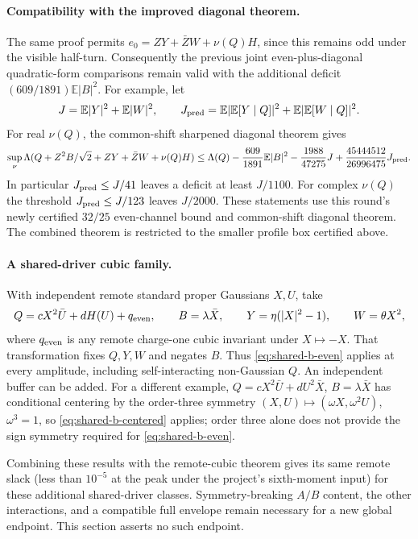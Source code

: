 \paragraph{Compatibility with the improved diagonal theorem.}
The same proof permits $e_0=ZY+\bar ZW+\nu(Q)H$, since this remains odd
under the visible half-turn. Consequently the previous joint
 even-plus-diagonal quadratic-form comparisons remain valid with the
additional deficit $(609/1891)\mathbb E|B|^2$. For example, let
\[
 J=\mathbb E|Y|^2+\mathbb E|W|^2,\qquad
 J_{\rm pred}=\mathbb E|\mathbb E[Y\mid Q]|^2+
               \mathbb E|\mathbb E[W\mid Q]|^2.
\]
For real $\nu(Q)$, the common-shift sharpened diagonal theorem gives
\[
 \sup_\nu\Lambda(Q+Z^2B/\sqrt2+ZY+\bar ZW+\nu(Q)H)
 \le\Lambda(Q)-\frac{609}{1891}\mathbb E|B|^2
 -\frac{1988}{47275}J+\frac{45444512}{26996475}J_{\rm pred}.
\]
In particular $J_{\rm pred}\le J/41$ leaves a deficit at least $J/1100$.
For complex $\nu(Q)$ the threshold $J_{\rm pred}\le J/123$
leaves $J/2000$. These statements use this round's newly certified
$32/25$ even-channel bound and common-shift diagonal theorem. The combined
theorem is restricted to the smaller profile box certified above.

\paragraph{A shared-driver cubic family.}
With independent remote standard proper Gaussians $X,U$, take
\[
 Q=cX^2\bar U+dH(U)+q_{\rm even},\qquad B=\lambda\bar X,
 \qquad Y=\eta(|X|^2-1),\qquad W=\theta X^2,
\]
where $q_{\rm even}$ is any remote charge-one cubic invariant under
$X\mapsto-X$. That transformation fixes $Q,Y,W$ and negates $B$.
Thus \eqref{eq:shared-b-even} applies at every amplitude, including
self-interacting non-Gaussian $Q$. An independent buffer can be added.
For a different example, $Q=cX^2\bar U+dU^2\bar X$, $B=\lambda\bar X$
has conditional centering by the order-three symmetry
$(X,U)\mapsto(\omega X,\omega^2U)$, $\omega^3=1$, so
\eqref{eq:shared-b-centered} applies; order three alone does not provide
the sign symmetry required for \eqref{eq:shared-b-even}.

Combining these results with the remote-cubic theorem gives its same
remote slack (less than $10^{-5}$ at the peak under the project's
sixth-moment input) for these additional shared-driver classes.
Symmetry-breaking $A/B$ content, the other interactions, and a compatible
full envelope remain necessary for a new global endpoint. This section
asserts no such endpoint.


